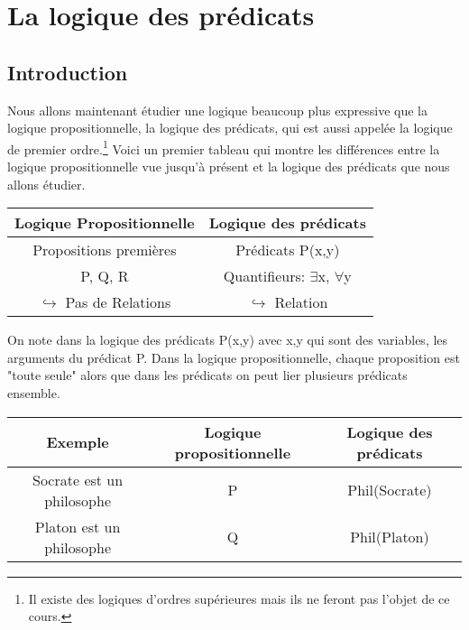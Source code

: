 
\section{La logique des prédicats}
 
\subsection{Introduction}

Nous allons maintenant étudier une logique beaucoup plus expressive que la
logique propositionnelle, la logique des prédicats, qui est aussi appelée
la logique de premier ordre.\footnote{Il existe des logiques d'ordres supérieures
mais ils ne feront pas l'objet de ce cours.}
Voici un premier tableau qui montre les différences entre la logique propositionnelle vue jusqu'à présent et la logique des prédicats que nous allons étudier.
\begin{center}
\begin{tabular}{|c|c|}
\hline 
Logique Propositionnelle & Logique des prédicats \\ 
\hline
Propositions premières & Prédicats P(x,y) \\ 
P, Q, R & Quantifieurs: $\exists$x, $\forall$y \\ 
$\hookrightarrow$ Pas de Relations & $\hookrightarrow$ Relation \\ 
\hline 
\end{tabular} 
\end{center}

On note dans la logique des prédicats P(x,y) avec x,y qui sont des variables, les arguments du prédicat P.
Dans la logique propositionnelle, chaque proposition est "toute seule" alors que dans les prédicats on peut lier plusieurs prédicats ensemble.


\begin{center}
\begin{tabular}{|c|c|c|}
\hline 
Exemple & Logique propositionnelle & Logique des prédicats \\ 
\hline 
Socrate est un philosophe & P & Phil(Socrate) \\ 
Platon est un philosophe & Q & Phil(Platon) \\ 
\hline 
\end{tabular} 
\end{center}


